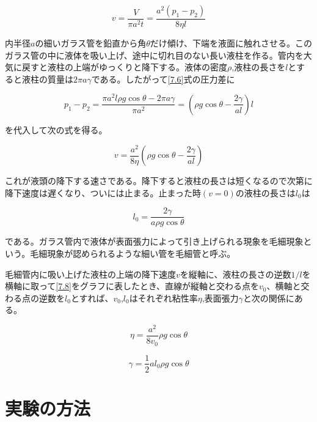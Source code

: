 \documentclass{jsarticle}
\begin{document}
\begin{equation}
\label{7.6}
    v = \frac{V}{\pi a^2 t} = \frac{a^2(p_1 - p_2)}{8\eta l}
\end{equation}

内半径$a$の細いガラス管を鉛直から角$\theta$だけ傾け、下端を液面に触れさせる。このガラス管の中に液体を吸い上げ、途中に切れ目のない長い液柱を作る。管内を大気に戻すと液柱の上端がゆっくりと降下する。液体の密度$\rho$,液柱の長さを$l$とすると液柱の質量は$2\pi a\gamma$である。したがって\ref{7.6}式の圧力差に

\begin{equation}
    p_1 - p_2 = \frac{\pi a^2 l \rho g \cos{\theta} - 2\pi a \gamma}{\pi a^2} = (\rho g \cos{\theta} - \frac{2\gamma}{al})l
\end{equation}

を代入して次の式を得る。

\begin{equation}
\label{7.8}
    v = \frac{a^2}{8\eta}(\rho g \cos{\theta} - \frac{2\gamma}{al})
\end{equation}

これが液頭の降下する速さである。降下すると液柱の長さは短くなるので次第に降下速度は遅くなり、ついには止まる。止まった時$(v = 0)$の液柱の長さは$l_0$は

\begin{equation}
    l_0 = \frac{2\gamma}{a\rho g \cos{\theta}}
\end{equation}

である。ガラス管内で液体が表面張力によって引き上げられる現象を毛細現象という。毛細現象が認められるような細い管を毛細管と呼ぶ。\\

\par 毛細管内に吸い上げた液柱の上端の降下速度$v$を縦軸に、液柱の長さの逆数$1/l$を横軸に取って\ref{7.8}をグラフに表したとき、直線が縦軸と交わる点を$v_0$、横軸と交わる点の逆数を$l_0$とすれば、$v_0$,$l_0$はそれぞれ粘性率$\eta$,表面張力$\gamma$と次の関係にある。

\begin{equation}
    \eta = \frac{a^2}{8v_0}\rho g \cos{\theta}
\end{equation}

\begin{equation}
    \gamma = \frac{1}{2}al_0\rho g \cos{\theta}
\end{equation}

\section{実験の方法}
\end{document}
